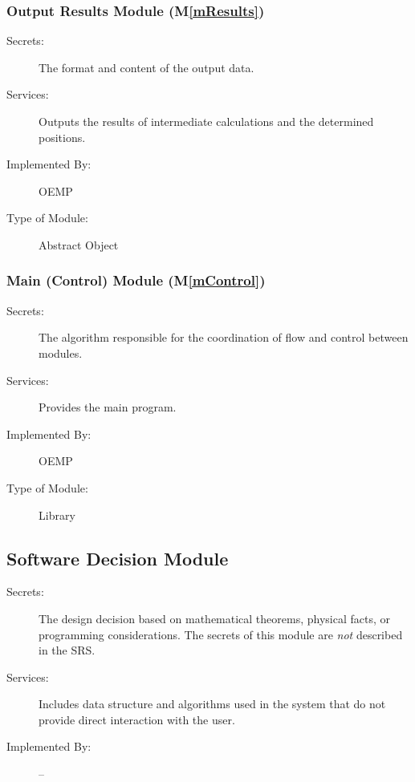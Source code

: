 \documentclass[12pt, titlepage]{article}
\newcommand{\mref}[1]{M\ref{#1}}
\begin{document}
\subsubsection{Output Results Module (\mref{mResults})}
\begin{description}
  \item[Secrets:]The format and content of the output data.
  \item[Services:]Outputs the results of intermediate calculations and the determined positions. 
  \item[Implemented By:] OEMP
  \item[Type of Module:] Abstract Object
\end{description}

\subsubsection{Main (Control) Module (\mref{mControl})}
\begin{description}
  \item[Secrets:]The algorithm responsible for the coordination of flow and control between modules.
  \item[Services:]Provides the main program. 
  \item[Implemented By:] OEMP
  \item[Type of Module:] Library
\end{description}

\subsection{Software Decision Module}

\begin{description}
\item[Secrets:] The design decision based on mathematical theorems, physical
  facts, or programming considerations. The secrets of this module are
  \emph{not} described in the SRS.
\item[Services:] Includes data structure and algorithms used in the system that
  do not provide direct interaction with the user. 
\item[Implemented By:] --
\end{description}
\end{document}
